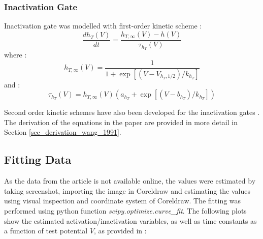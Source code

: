 \documentclass[../../workflow.tex]{subfiles}
\begin{document}
\subsubsection{Inactivation Gate}

Inactivation gate was modelled with first-order kinetic scheme
\parencite{destexheVivoVitroComputational1996, destexheSynthesisModelsExcitable1994}:
\begin{equation*}
    \frac{dh_T(V)}{dt} = \frac{h_{T,\infty}(V) - h(V)}{\tau_{h_T}(V)}
\end{equation*}
where \parencite{destexheVivoVitroComputational1996, wangModelTtypeCalcium1991}:
\begin{equation}\label{eq_model_r5_t_type_steady_state_inactivation}
    h_{T,\infty}(V) = \frac{1}{1 + \exp{[(V - V_{h_T,1/2})/k_{h_T}]}}
\end{equation}
and \parencite{wangMultipleDynamicalModes1994}:
\begin{equation}\label{eq_model_r5_t_type_tau_inactivation}
    \tau_{h_T}(V) = h_{T,\infty}(V)(a_{h_T} + \exp{[(V - b_{h_T})/k_{h_T}]})
\end{equation}

\begin{note}
    Second order kinetic schemes have also been developed for the inactivation gates
    \parencite{wangModelTtypeCalcium1991}. The derivation of the equations in the paper are provided in
    more detail in Section \ref{sec_derivation_wang_1991}.
\end{note}


\subsection{Fitting Data}

As the data from the article is not available online, the values were estimated by taking screenshot,
importing the image in Coreldraw and estimating the values using visual inspection and coordinate
system of Coreldraw. The fitting was performed using python function \textit{scipy.optimize.curve\_fit}.
The following plots show the estimated activation/inactivation variables, as well as time constants
as a function of test potential $V$, as provided in \parencite{jeongCaa1TFlyTtype2015}:
\end{document}

